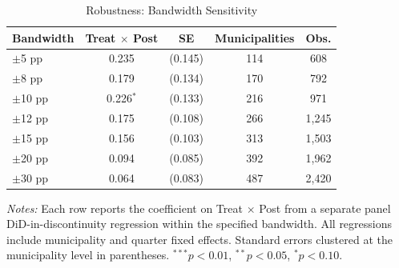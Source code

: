 \begin{table}[t]
\centering
\begin{threeparttable}
\caption{Robustness: Bandwidth Sensitivity}
\label{tab:bandwidth}
\begin{tabular}{lcccc}
\hline\hline
Bandwidth & Treat $\times$ Post & SE & Municipalities & Obs. \\
\hline
$\pm$5 pp & 0.235 & (0.145) & 114 & 608 \\
$\pm$8 pp & 0.179 & (0.134) & 170 & 792 \\
$\pm$10 pp & 0.226$^{*}$ & (0.133) & 216 & 971 \\
$\pm$12 pp & 0.175 & (0.108) & 266 & 1,245 \\
$\pm$15 pp & 0.156 & (0.103) & 313 & 1,503 \\
$\pm$20 pp & 0.094 & (0.085) & 392 & 1,962 \\
$\pm$30 pp & 0.064 & (0.083) & 487 & 2,420 \\
\hline\hline
\end{tabular}
\begin{tablenotes}[flushleft]
\item \textit{Notes:} Each row reports the coefficient on Treat $\times$ Post from a separate panel DiD-in-discontinuity regression within the specified bandwidth. All regressions include municipality and quarter fixed effects. Standard errors clustered at the municipality level in parentheses. $^{***}p<0.01$, $^{**}p<0.05$, $^{*}p<0.10$.
\end{tablenotes}
\end{threeparttable}
\end{table}

